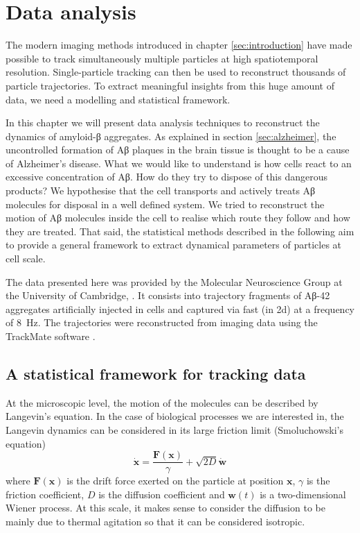 
\chapter{Data analysis}\label{sec:data_analysis}


The modern imaging methods introduced in chapter \ref{sec:introduction} have made possible to track simultaneously multiple particles at high spatiotemporal resolution. Single-particle tracking can then be used to reconstruct thousands of particle trajectories. To extract meaningful insights from this huge amount of data, we need a modelling and statistical framework.

In this chapter we will present data analysis techniques to reconstruct the dynamics of amyloid-β aggregates. As explained in section \ref{sec:alzheimer}, the uncontrolled formation of Aβ plaques in the brain tissue is thought to be a cause of Alzheimer's disease. What we would like to understand is how cells react to an excessive concentration of Aβ. How do they try to dispose of this dangerous products? We hypothesise that the cell transports and actively treats Aβ molecules for disposal in a well defined system. We tried to reconstruct the motion of Aβ molecules inside the cell to realise which route they follow and how they are treated. That said, the statistical methods described in the following aim to provide a general framework to extract dynamical parameters of particles at cell scale.

The data presented here was provided by the Molecular Neuroscience Group at the University of Cambridge, . It consists into trajectory fragments of Aβ-42 aggregates artificially injected in  cells and captured via fast  (in 2d) at a frequency of \SI{8}{\hertz}. The trajectories were reconstructed from imaging data using the TrackMate software .

\section{A statistical framework for tracking data}

At the microscopic level, the motion of the molecules can be described by Langevin's equation. In the case of biological processes we are interested in, the Langevin dynamics can be considered in its large friction limit (Smoluchowski's equation) 
\begin{equation} \label{eq:smoluchowski}
 \dot{\bm{x}} = \frac{\bm{F}(\bm{x})}{\gamma} + \sqrt{2D} \dot{\bm{w}}
\end{equation}
where $\bm{F}(\bm{x})$ is the drift force exerted on the particle at position $\bm{x}$, $\gamma$ is the friction coefficient, $D$ is the diffusion coefficient and $\bm{w}(t)$ is a two-dimensional Wiener process. At this scale, it makes sense to consider the diffusion to be mainly due to thermal agitation so that it can be considered isotropic.

